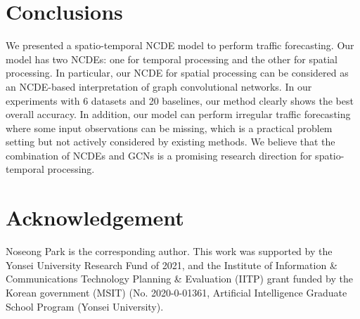 \documentclass[letterpaper]{article} \usepackage{aaai22}  \usepackage{times}  \usepackage{helvet}  \usepackage{courier}  \usepackage[hyphens]{url}  \usepackage{graphicx} \urlstyle{rm} \def\UrlFont{\rm}  \usepackage{natbib}  \usepackage{caption} \DeclareCaptionStyle{ruled}{labelfont=normalfont,labelsep=colon,strut=off} \frenchspacing  \setlength{\pdfpagewidth}{8.5in}  \setlength{\pdfpageheight}{11in}  \usepackage{stfloats}
\begin{document}
\section{Conclusions}
We presented a spatio-temporal NCDE model to perform traffic forecasting. Our model has two NCDEs: one for temporal processing and the other for spatial processing. In particular, our NCDE for spatial processing can be considered as an NCDE-based interpretation of graph convolutional networks. In our experiments with 6 datasets and 20 baselines, our method clearly shows the best overall accuracy. In addition, our model can perform irregular traffic forecasting where some input observations can be missing, which is a practical problem setting but not actively considered by existing methods. We believe that the combination of NCDEs and GCNs is a promising research direction for spatio-temporal processing.


\section*{Acknowledgement}
Noseong Park is the corresponding author. This work was supported by the Yonsei University Research Fund of 2021, and the Institute of Information \& Communications Technology Planning \& Evaluation (IITP) grant funded by the Korean government (MSIT) (No. 2020-0-01361, Artificial Intelligence Graduate School Program (Yonsei University).



\clearpage


\appendix
\end{document}
